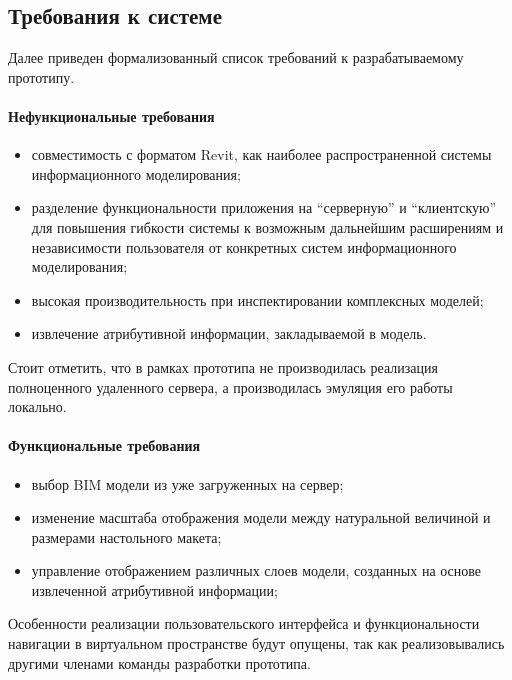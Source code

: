 ﻿\subsection{Требования к системе}
\label{subsections:Requirements}

Далее приведен формализованный список требований к разрабатываемому прототипу.

\paragraph{Нефункциональные требования}
\begin{itemize}
    \item совместимость с форматом Revit,
    как наиболее распространенной системы информационного моделирования;
    \item разделение функциональности приложения на ``серверную'' и ``клиентскую''
    для повышения гибкости системы к возможным дальнейшим расширениям и
    независимости пользователя от конкретных систем информационного моделирования;
    \item высокая производительность при инспектировании комплексных моделей;
    \item извлечение атрибутивной информации,
    закладываемой в модель.
\end{itemize}

Стоит отметить, что в рамках прототипа не производилась
реализация полноценного удаленного сервера,
а производилась эмуляция его работы локально.

\paragraph{Функциональные требования}
\begin{itemize}
    \item выбор BIM модели из уже загруженных на сервер;
    \item изменение масштаба отображения модели
    между натуральной величиной и размерами настольного макета;
    \item управление отображением различных слоев модели,
    созданных на основе извлеченной атрибутивной информации;
\end{itemize}

Особенности реализации пользовательского интерфейса и
функциональности навигации в виртуальном пространстве будут опущены,
так как реализовывались другими членами команды разработки прототипа.